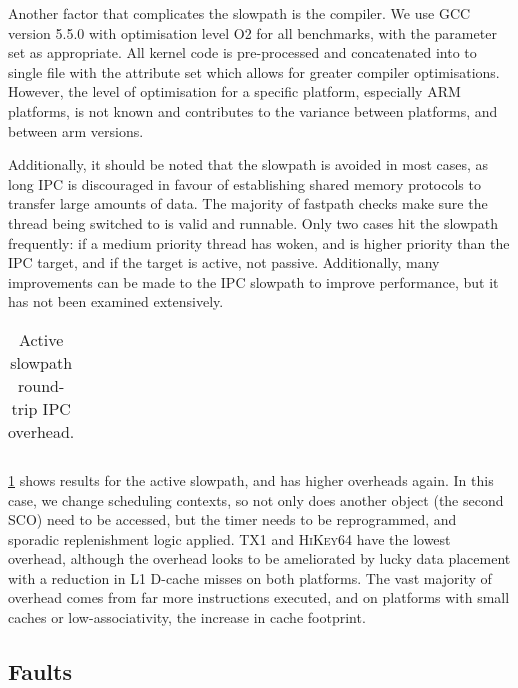 Another factor that complicates the slowpath is the compiler. We use GCC version 5.5.0 with optimisation
level O2 for all benchmarks, with the  parameter set as appropriate. All kernel
code is pre-processed and concatenated into to single file with the  attribute
set which allows for greater compiler optimisations. However, the level of optimisation for a
specific platform, especially ARM platforms, is not known and contributes to the variance between
platforms, and between arm versions.

Additionally, it should be noted that the slowpath is avoided in most cases, as long IPC is discouraged in
favour of establishing shared memory protocols to transfer large amounts of data. The majority of
fastpath checks make sure the thread being switched to is valid and runnable. Only two cases hit the
slowpath frequently: if a medium priority thread has woken, and is higher priority than the
\gls{IPC} target, and if the target is active, not passive. 
Additionally, many improvements can be made to the \gls{IPC} slowpath to improve
performance, but it has not been examined extensively.

\begin{table}[t]\centering
    \begin{tabularx}{\textwidth}{Xlllllll}\toprule
        
        \bottomrule
    \end{tabularx}
\caption{Active slowpath round-trip IPC overhead.}
\label{t:slowpath-ipc-micro-active}
\end{table}


\cref{t:slowpath-ipc-micro-active} shows results for the active slowpath, and has higher overheads
again. In this case, we change scheduling
contexts, so not only does another object (the second \gls{SCO}) need to be accessed, but the timer
needs to be reprogrammed, and sporadic replenishment logic applied. \textsc{TX1} and
\textsc{HiKey64} have the lowest overhead, although the overhead looks to be ameliorated by lucky
data placement with a reduction in L1 D-cache misses on both platforms. The vast majority of
overhead comes from far more instructions executed, and on platforms with small caches or
low-associativity, the increase in cache footprint.  


\subsection{Faults}

